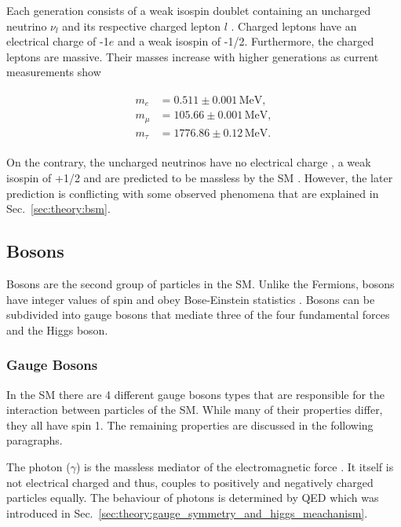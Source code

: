 \documentclass[bachelor,ngerman,english]{GAUBM}
\begin{document}
Each generation consists of a weak isospin doublet containing an uncharged neutrino $\nu_l$ and its respective charged lepton $l$ \cite{theory:general_sm}. Charged leptons have an electrical charge of -1$e$ and a weak isospin of -1/2. Furthermore, the charged leptons are massive. Their masses increase with higher generations as current measurements \cite{pdg} show

\begin{gather}
    \begin{aligned}
        m_e     &=0.511\pm0.001\,\text{MeV},\\
        m_\mu   &=105.66\pm0.001\,\text{MeV},\\
        m_\tau  &=1776.86\pm0.12\,\text{MeV}.
        \label{eq:mass_leptons}
    \end{aligned}
\end{gather}

On the contrary, the uncharged neutrinos have no electrical charge \cite{pdg}, a weak isospin of +1/2 and are predicted to be massless by the SM \cite{theory:general_sm}. However, the later prediction is conflicting with some observed phenomena that are explained in Sec.~\ref{sec:theory:bsm}.


\subsection{Bosons}
\label{sec:theory:bosons}
Bosons are the second group of particles in the SM. Unlike the Fermions, bosons have integer values of spin and obey Bose-Einstein statistics \cite{theory:fermions_bosons}. Bosons can be subdivided into gauge bosons that mediate three of the four fundamental forces and the Higgs boson. %

\subsubsection*{Gauge Bosons}
In the SM there are 4 different gauge bosons types \cite{theory:general_sm} that are responsible for the interaction between particles of the SM. While many of their properties differ, they all have spin 1. The remaining properties are discussed in the following paragraphs.  

The photon ($\gamma$) is the massless mediator of the electromagnetic force \cite{theory:qed01}. It itself is not electrical charged and thus, couples to positively and negatively charged particles equally. The behaviour of photons is determined by QED which was introduced in Sec.~\ref{sec:theory:gauge_symmetry_and_higgs_meachanism}.
\end{document}
